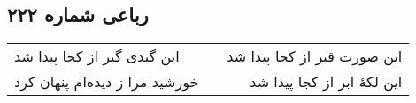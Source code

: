 \begin{center}
\section*{رباعی شماره ۲۲۲}
\label{sec:sh222}
\begin{longtable}{l p{0.5cm} r}
این گیدی گبر از کجا پیدا شد
&&
این صورت قبر از کجا پیدا شد
\\
خورشید مرا ز دیده‌ام پنهان کرد
&&
این لکهٔ ابر از کجا پیدا شد
\\
\end{longtable}
\end{center}
